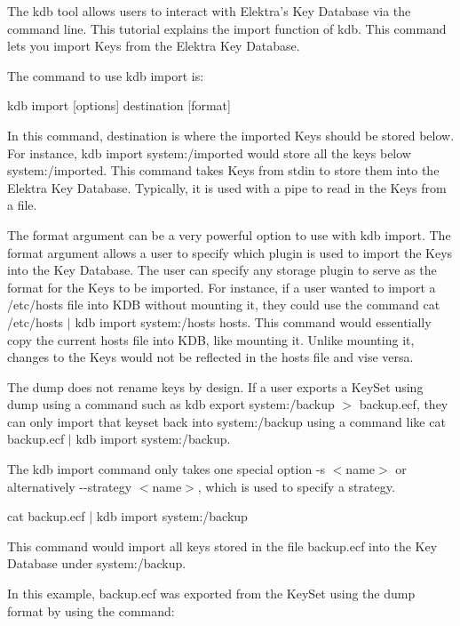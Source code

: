 The kdb tool allows users to interact with Elektra’s Key Database via the command line. This tutorial explains the import function of kdb. This command lets you import Keys from the Elektra Key Database.

The command to use kdb import is\+:


\begin{DoxyCode}
kdb import [options] destination [format]
\end{DoxyCode}


In this command, {\ttfamily destination} is where the imported Keys should be stored below. For instance, {\ttfamily kdb import system\+:/imported} would store all the keys below {\ttfamily system\+:/imported}. This command takes Keys from {\ttfamily stdin} to store them into the Elektra Key Database. Typically, it is used with a pipe to read in the Keys from a file.

The format argument can be a very powerful option to use with kdb import. The format argument allows a user to specify which plugin is used to import the Keys into the Key Database. The user can specify any storage plugin to serve as the format for the Keys to be imported. For instance, if a user wanted to import a {\ttfamily /etc/hosts} file into K\+DB without mounting it, they could use the command {\ttfamily cat /etc/hosts $\vert$ kdb import system\+:/hosts hosts}. This command would essentially copy the current hosts file into K\+DB, like mounting it. Unlike mounting it, changes to the Keys would not be reflected in the hosts file and vise versa.

The dump does not rename keys by design. If a user exports a Key\+Set using dump using a command such as {\ttfamily kdb export system\+:/backup $>$ backup.\+ecf}, they can only import that keyset back into {\ttfamily system\+:/backup} using a command like {\ttfamily cat backup.\+ecf $\vert$ kdb import system\+:/backup}.

The kdb import command only takes one special option {\ttfamily -\/s $<$name$>$} or alternatively {\ttfamily -\/-\/strategy $<$name$>$}, which is used to specify a strategy.


\begin{DoxyCode}
cat backup.ecf | kdb import system:/backup
\end{DoxyCode}


This command would import all keys stored in the file {\ttfamily backup.\+ecf} into the Key Database under {\ttfamily system\+:/backup}.

In this example, {\ttfamily backup.\+ecf} was exported from the Key\+Set using the dump format by using the command\+:


